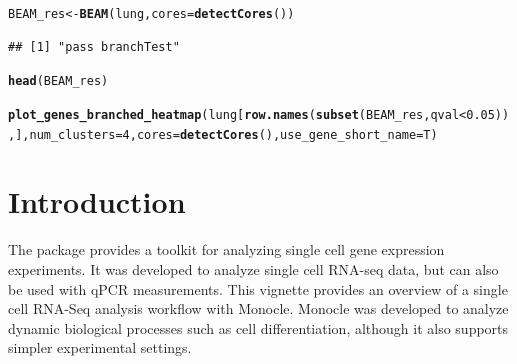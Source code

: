 \documentclass[10pt,oneside]{article}\usepackage[]{graphicx}\usepackage[]{color}
\makeatletter
\newcommand{\hlnum}[1]{\textcolor[rgb]{0.686,0.059,0.569}{#1}}%
\newcommand{\hlopt}[1]{\textcolor[rgb]{0,0,0}{#1}}%
\newcommand{\hlstd}[1]{\textcolor[rgb]{0.345,0.345,0.345}{#1}}%
\newcommand{\hlkwb}[1]{\textcolor[rgb]{0.69,0.353,0.396}{#1}}%
\newcommand{\hlkwc}[1]{\textcolor[rgb]{0.333,0.667,0.333}{#1}}%
\newcommand{\hlkwd}[1]{\textcolor[rgb]{0.737,0.353,0.396}{\textbf{#1}}}%
\newenvironment{kframe}{%
 \def\at@end@of@kframe{}%
 \ifinner\ifhmode%
  \def\at@end@of@kframe{\end{minipage}}%
  \begin{minipage}{\columnwidth}%
 \fi\fi%
 \def\FrameCommand##1{\hskip\@totalleftmargin \hskip-\fboxsep
 \colorbox{shadecolor}{##1}\hskip-\fboxsep
     \hskip-\linewidth \hskip-\@totalleftmargin \hskip\columnwidth}%
 \MakeFramed {\advance\hsize-\width
   \@totalleftmargin\z@ \linewidth\hsize
   \@setminipage}}%
 {\par\unskip\endMakeFramed%
 \at@end@of@kframe}
\newenvironment{knitrout}{}{} %
\makeatother
\begin{document}
\begin{knitrout}
\color{fgcolor}\begin{kframe}
\begin{alltt}
\hlstd{BEAM_res} \hlkwb{<-} \hlkwd{BEAM}\hlstd{(lung,} \hlkwc{cores} \hlstd{=} \hlkwd{detectCores}\hlstd{())}
\end{alltt}
\begin{verbatim}
## [1] "pass branchTest"
\end{verbatim}


{\ttfamily\noindent\bfseries\color{errorcolor}{\#\# Error: Results must have the same dimensions.}}\begin{alltt}
\hlkwd{head}\hlstd{(BEAM_res)}
\end{alltt}


{\ttfamily\noindent\bfseries\color{errorcolor}{\#\# Error in head(BEAM\_res): object 'BEAM\_res' not found}}\begin{alltt}
\hlkwd{plot_genes_branched_heatmap}\hlstd{(lung[}\hlkwd{row.names}\hlstd{(}\hlkwd{subset}\hlstd{(BEAM_res, qval} \hlopt{<} \hlnum{0.05}\hlstd{)),],} \hlkwc{num_clusters} \hlstd{=} \hlnum{4}\hlstd{,} \hlkwc{cores} \hlstd{=} \hlkwd{detectCores}\hlstd{(),} \hlkwc{use_gene_short_name} \hlstd{= T)}
\end{alltt}


{\ttfamily\noindent\bfseries\color{errorcolor}{\#\# Error in pData(cds): error in evaluating the argument 'object' in selecting a method for function 'pData': Error in lung[row.names(subset(BEAM\_res, qval < 0.05)), ] : \\\#\#\ \  error in evaluating the argument 'i' in selecting a method for function '[': Error in subset(BEAM\_res, qval < 0.05) : object 'BEAM\_res' not found\\\#\# Calls: row.names -> subset}}\end{kframe}
\end{knitrout}


\section{Introduction}

The  package provides a toolkit for analyzing single cell gene expression experiments. It was developed to analyze single cell RNA-seq data, but can also be used with qPCR measurements. This vignette provides an overview of a single cell RNA-Seq analysis workflow with Monocle. Monocle was developed to analyze dynamic biological processes such as cell differentiation, although it also supports simpler experimental settings.
\end{document}
